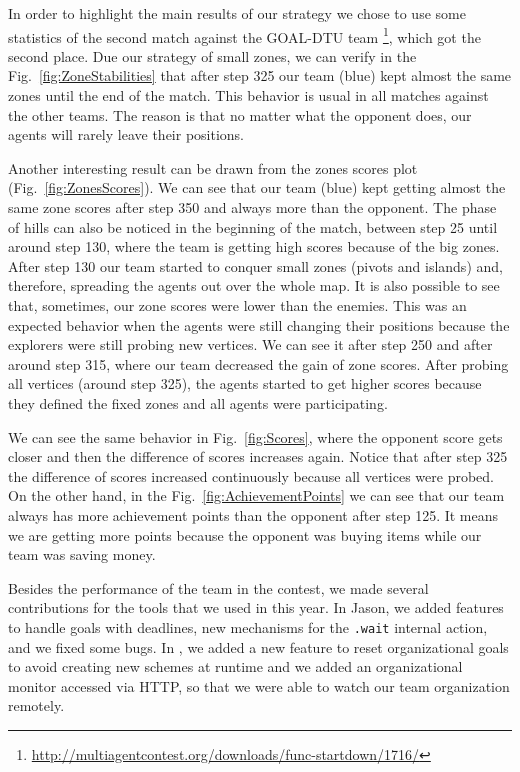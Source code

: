 In order to highlight the main results of our strategy we chose to use some statistics of the second match against the GOAL-DTU team \footnote{\url{http://multiagentcontest.org/downloads/func-startdown/1716/}}, which got the second place. Due our strategy of small zones, we can verify in the Fig.~\ref{fig:ZoneStabilities}  that after step 325 our team (blue) kept almost the same zones until the end of the match. This behavior is usual in all matches against the other teams. The reason is that no matter what the opponent does, our agents will rarely leave their positions.

Another interesting result can be drawn from the zones scores plot (Fig.~\ref{fig:ZonesScores}). We can see that our team (blue) kept getting almost the same zone scores after step 350 and always more than the opponent. The phase of hills can also be noticed in the beginning of the match, between step 25 until around step 130, where the team is getting high scores because of the big zones. After step 130 our team started to conquer small zones (pivots and islands) and, therefore, spreading the agents out over the whole map. It is also possible to see that, sometimes, our zone scores were lower than the enemies. This was an expected behavior when the agents were still changing their positions because the explorers were still probing new vertices. We can see it after step 250 and after around step 315, where our team decreased the gain of zone scores. After probing all vertices (around step 325), the agents started to get higher scores because they defined the fixed zones and all agents were participating.

We can see the same behavior in Fig.~\ref{fig:Scores}, where the opponent score gets closer and then the difference of scores increases again. Notice that after step 325 the difference of scores increased continuously because all vertices were probed. On the other hand, in the Fig.~\ref{fig:AchievementPoints} we can see that our team always has more achievement points than the opponent after step 125. It means we are getting more points because the opponent was buying items while our team was saving money.

\bigskip

Besides the performance of the team in the contest, we made several contributions for the tools that we used in this year. In Jason, we added features to handle goals with deadlines, new mechanisms for the \texttt{.wait} internal action, and we fixed some bugs. In \moise, we added a new feature to reset organizational goals to avoid creating new schemes at runtime and we added an organizational monitor accessed via HTTP, so that we were able to watch our team organization remotely.


